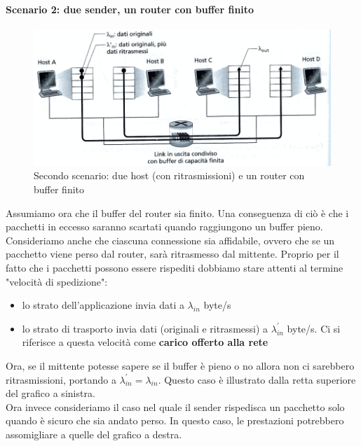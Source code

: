 \documentclass[11pt,a4paper]{article}
\begin{document}
\paragraph{Scenario 2: due sender, un router con buffer finito}
\begin{figure}
	\includegraphics[scale=0.6]{img/041.png}
	\caption{Secondo scenario: due host (con ritrasmissioni) e un router con buffer finito}
\end{figure}
Assumiamo ora che il buffer del router sia finito. Una conseguenza di ciò è che i pacchetti in eccesso saranno scartati quando raggiungono un buffer pieno. Consideriamo anche che ciascuna connessione sia affidabile, ovvero che se un pacchetto viene perso dal router, sarà ritrasmesso dal mittente. Proprio per il fatto che i pacchetti possono essere rispediti dobbiamo stare attenti al termine "velocità di spedizione":
\begin{itemize}
	\item lo strato dell'applicazione invia dati a $\lambda_{in}$ byte/s
	\item lo strato di trasporto invia dati (originali e ritrasmessi) a $\lambda_{in}^{'}$ byte/s. Ci si riferisce a questa velocità come \textbf{carico offerto alla rete}
\end{itemize}
Ora, se il mittente potesse sapere se il buffer è pieno o no allora non ci sarebbero ritrasmissioni, portando a $\lambda_{in}^{'} = \lambda_{in}$. Questo caso è illustrato dalla retta superiore del grafico a sinistra. \\
Ora invece consideriamo il caso nel quale il sender rispedisca un pacchetto solo quando è sicuro che sia andato perso. In questo caso, le prestazioni potrebbero assomigliare a quelle del grafico a destra.
\end{document}
